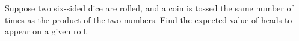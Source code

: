 Suppose two six-sided dice are rolled, and a coin is tossed the same number of times as the product of the two numbers. Find the expected value of heads to appear on a given roll.

